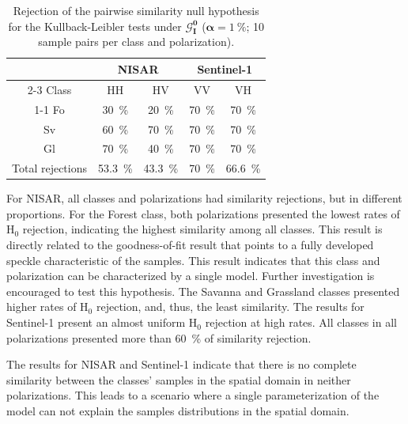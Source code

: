 \begin{table}[htbp]
\centering
\small
\renewcommand{\arraystretch}{1.15}
\begin{tabular*}{\columnwidth}{@{\extracolsep{\fill}}ccccc}
\toprule
 & \multicolumn{2}{c}{NISAR} & \multicolumn{2}{c}{Sentinel-1} \\
\cmidrule{2-3}\cmidrule{4-5}
Class & $\text{HH}$ & $\text{HV}$ & $\text{VV}$ & $\text{VH}$ \\
\cmidrule{1-1}\cmidrule{2-2}\cmidrule{3-3}\cmidrule{4-4}\cmidrule{5-5}
Fo & \qty{30}{\percent} & \qty{20}{\percent} & \qty{70}{\percent} & \qty{70}{\percent} \\
Sv & \qty{60}{\percent} & \qty{70}{\percent} & \qty{70}{\percent} & \qty{70}{\percent} \\
Gl & \qty{70}{\percent} & \qty{40}{\percent} & \qty{70}{\percent} & \qty{70}{\percent} \\
\midrule
Total rejections & \qty{53.3}{\percent} & \qty{43.3}{\percent} & \qty{70}{\percent} & \qty{66.6}{\percent} \\
\bottomrule
\end{tabular*}
\caption{Rejection of the pairwise similarity null hypothesis for the Kullback-Leibler tests under $\bm{\mathcal G}^{\bm 0}_{\bm I}$ ($\bm\alpha=\qty{1}{\percent}$; \qty{10}{} sample pairs per class and polarization).}
\label{tab:kl-rejection}
\end{table}
\vspace{0.3cm}

For NISAR, all classes and polarizations had similarity rejections, but in different proportions.
For the Forest class, both polarizations presented the lowest rates of H$_{0}$ rejection, indicating the highest similarity among all classes.
This result is directly related to the goodness-of-fit result that points to a fully developed speckle characteristic of the samples.
This result indicates that this class and polarization can be characterized by a single model.
Further investigation is encouraged to test this hypothesis.
The Savanna and Grassland classes presented higher rates of H$_{0}$ rejection, and, thus, the least similarity.
The results for Sentinel-1 present an almost uniform H$_{0}$ rejection at high rates.
All classes in all polarizations presented more than \qty{60}{\percent} of similarity rejection.

The results for NISAR and Sentinel-1 indicate that there is no complete similarity between the classes' samples in the spatial domain in neither polarizations.
This leads to a scenario where a single parameterization of the model can not explain the samples distributions in the spatial domain.

